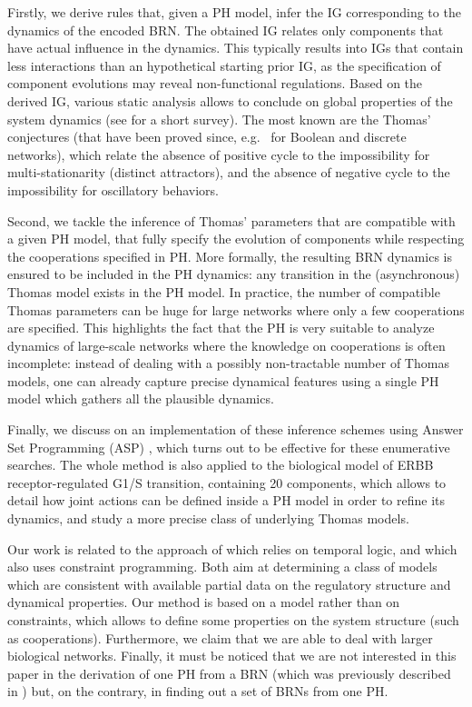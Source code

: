 Firstly, we derive rules that, given a PH model, infer the IG corresponding to the dynamics of the
encoded BRN.
The obtained IG relates only components that have actual influence in the dynamics.
This typically results into IGs that contain less interactions than an hypothetical starting prior
IG, as the specification of component evolutions may reveal non-functional regulations.
Based on the derived IG, various static analysis allows to conclude on global properties
of the system dynamics (see \cite{PR11-SASB} for a short survey).
The most known are the Thomas' conjectures (that have been proved since,
e.g.~\cite{RRT08,RiCo07,Richard2010378}
for Boolean and discrete networks),
which relate the absence of
positive cycle to the impossibility for multi-stationarity (distinct attractors),
and the absence of negative cycle to the impossibility for oscillatory behaviors.

Second, we tackle the inference of Thomas' parameters that are compatible with a given PH
model, \ie that fully specify the evolution of components while respecting the cooperations
specified in PH.
More formally, the resulting BRN dynamics is ensured to be included in the PH dynamics: any
transition in the (asynchronous) Thomas model exists in the PH model.
In practice, the number of compatible Thomas parameters can be huge for large networks where only a
few cooperations are specified.
This highlights the fact that the PH is very suitable to analyze dynamics of large-scale networks
where the knowledge on cooperations is often incomplete:
instead of dealing with a possibly non-tractable number of Thomas models, one can already capture
precise dynamical features using a single PH model which gathers all the plausible dynamics.

Finally, we discuss on an implementation of these inference schemes using Answer Set
Programming (ASP) \cite{Baral03},  which turns out to be effective for these enumerative searches.
The whole method is also applied to the biological model of ERBB receptor-regulated G1/S transition,
containing 20 components,
which allows to detail how joint actions can be defined inside a PH model in order
to refine its dynamics, and study a more precise class of underlying Thomas models.

Our work is related to the approach of \cite{Khalis09} which relies on temporal logic, and \cite{20646302,DBLP:conf/ipcat/CorblinFTCT12} which also uses constraint programming.
Both aim at determining a class of models which are consistent with available partial data on the regulatory structure and dynamical properties.
Our method is based on a model rather than on constraints, which allows to define some properties on the system structure (such as cooperations).
Furthermore, we claim that we are able to deal with larger biological networks.
Finally, it must be noticed that we are not interested in this paper in the derivation of one PH
from a BRN (which was previously described in \cite{PMR10-TCSB}) but, on the contrary, in finding
out a set of BRNs from one PH.

